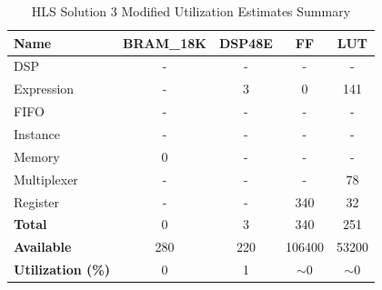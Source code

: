 \begin{table}[h]
	\centering
	\begin{tabular}{|l|c|c|c|c|}
		\hline
		\textbf{Name}    & \textbf{BRAM\_18K} & \textbf{DSP48E} & \textbf{FF} & \textbf{LUT} \\ \hline
		DSP              & -                   & -               & -           & -            \\ 
		Expression       & -                   & 3               & 0           & 141          \\ 
		FIFO             & -                   & -               & -           & -            \\ 
		Instance         & -                   & -               & -           & -            \\ 
		Memory           & 0                   & -               & -          & -            \\ 
		Multiplexer      & -                   & -               & -           & 78          \\ 
		Register         & -                   & -               & 340         & 32            \\ \hline
		\textbf{Total}   & 0                   & 3               & 340         & 251          \\ \hline
		\textbf{Available} & 280               & 220             & 106400      & 53200        \\ \hline
		\textbf{Utilization (\%)} & 0            & 1               & $\sim$0     & $\sim$0      \\ \hline
	\end{tabular}
	\caption{HLS Solution 3 Modified Utilization Estimates Summary}
	\label{tab:hls-solution-3-modified-utilization-estimates-summary}
\end{table}

